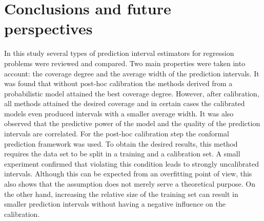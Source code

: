 \documentclass[smallcondensed]{svjour3}
\begin{document}
\section{Conclusions and future perspectives}

    In this study several types of prediction interval estimators for regression problems were reviewed and compared. Two main properties were taken into account: the coverage degree and the average width of the prediction intervals. It was found that without post-hoc calibration the methods derived from a probabilistic model attained the best coverage degree. However, after calibration, all methods attained the desired coverage and in certain cases the calibrated models even produced intervals with a smaller average width. It was also observed that the predictive power of the model and the quality of the prediction intervals are correlated. For the post-hoc calibration step the conformal prediction framework was used. To obtain the desired results, this method requires the data set to be split in a training and a calibration set. A small experiment confirmed that violating this condition leads to strongly uncalibrated intervals. Although this can be expected from an overfitting point of view, this also shows that the assumption does not merely serve a theoretical purpose. On the other hand, increasing the relative size of the training set can result in smaller prediction intervals without having a negative influence on the calibration.
\end{document}
